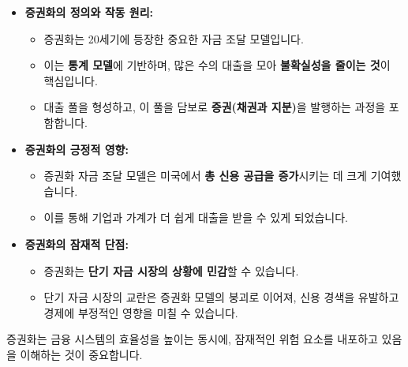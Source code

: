 \documentclass[11pt,a4paper]{article}
\begin{document}
\begin{tcolorbox}[colback=mygreen!10!white, colframe=mygreen!75!black, title=\textbf{학습 내용 요약}]
  \begin{itemize}
    \item \textbf{증권화의 정의와 작동 원리:}
      \begin{itemize}
        \item 증권화는 20세기에 등장한 중요한 자금 조달 모델입니다.
        \item 이는 \textbf{통계 모델}에 기반하며, 많은 수의 대출을 모아 \textbf{불확실성을 줄이는 것}이 핵심입니다.
        \item 대출 풀을 형성하고, 이 풀을 담보로 \textbf{증권(채권과 지분)}을 발행하는 과정을 포함합니다.
      \end{itemize}
    \item \textbf{증권화의 긍정적 영향:}
      \begin{itemize}
        \item 증권화 자금 조달 모델은 미국에서 \textbf{총 신용 공급을 증가}시키는 데 크게 기여했습니다.
        \item 이를 통해 기업과 가계가 더 쉽게 대출을 받을 수 있게 되었습니다.
      \end{itemize}
    \item \textbf{증권화의 잠재적 단점:}
      \begin{itemize}
        \item 증권화는 \textbf{단기 자금 시장의 상황에 민감}할 수 있습니다.
        \item 단기 자금 시장의 교란은 증권화 모델의 붕괴로 이어져, 신용 경색을 유발하고 경제에 부정적인 영향을 미칠 수 있습니다.
      \end{itemize}
  \end{itemize}
  증권화는 금융 시스템의 효율성을 높이는 동시에, 잠재적인 위험 요소를 내포하고 있음을 이해하는 것이 중요합니다.
\end{tcolorbox}
\end{document}
